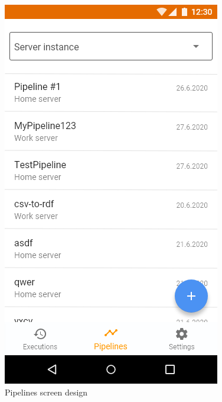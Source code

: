 \begin{figure}
\begin{minipage}[b]{0.32\textwidth}
    	\includegraphics[width=\textwidth]{pics/xd/Bottom Navigation - pipelines.png}
    	\caption[Pipelines]{Pipelines screen design}\label{fig:xdPipelines}
    \end{minipage}
    \begin{minipage}[b]{0.32\textwidth}

\end{minipage}
\end{figure}
